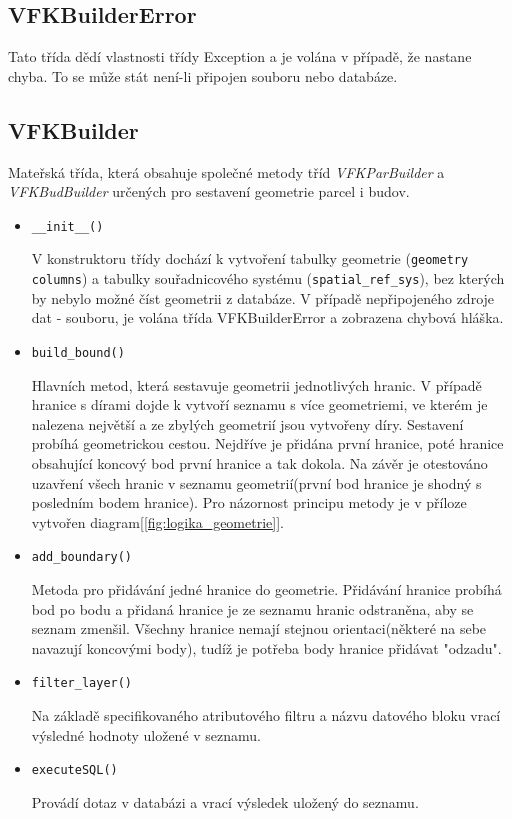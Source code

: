 \subsection{VFKBuilderError}
Tato třída dědí vlastnosti třídy Exception a je volána v případě, že
nastane chyba. To se může stát není-li připojen  souboru nebo
databáze.
\subsection{VFKBuilder}
\label{subsec:sestaveni_geometrie}
Mateřská třída, která obsahuje společné metody tříd
\textit{VFKParBuilder} a \textit{VFKBudBuilder} určených pro sestavení
geometrie parcel i budov.
\begin{itemize}[leftmargin=50pt]
\item \verb|__init__()|
		
V konstruktoru třídy dochází k vytvoření tabulky geometrie
(\verb|geometry columns|) a tabulky souřadnicového systému
(\verb|spatial_ref_sys|), bez kterých by nebylo možné číst geometrii z
databáze. V případě nepřipojeného zdroje dat -  souboru, je
volána třída VFKBuilderError a zobrazena chybová hláška.
\item \verb|build_bound()|

Hlavních metod, která sestavuje geometrii jednotlivých hranic. V
případě hranice s dírami dojde k vytvoří seznamu s více geometriemi,
ve kterém je nalezena největší a ze zbylých geometrií jsou vytvořeny
díry. Sestavení probíhá geometrickou cestou. Nejdříve je přidána první
hranice, poté hranice obsahující koncový bod první hranice a tak
dokola. Na závěr je otestováno uzavření všech hranic v seznamu
geometrií(první bod hranice je shodný s posledním bodem hranice). Pro
názornost principu metody je v příloze vytvořen
diagram[\ref{fig:logika_geometrie}].
\item \verb|add_boundary()|

Metoda pro přidávání jedné hranice do geometrie. Přidávání hranice
probíhá bod po bodu a přidaná hranice je ze seznamu hranic odstraněna,
aby se seznam zmenšil. Všechny hranice nemají stejnou
orientaci(některé na sebe navazují koncovými body), tudíž je potřeba
body hranice přidávat "odzadu".
\item \verb|filter_layer()|

Na základě specifikovaného atributového filtru a názvu datového bloku
vrací výsledné hodnoty uložené v seznamu.
\item \verb|executeSQL()|

Provádí  dotaz v databázi a vrací výsledek uložený do seznamu.

\end{itemize}
